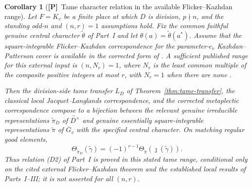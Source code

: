 \documentclass[11pt]{article}
\newcommand{\Gb}{\overline{G}}\newcommand{\GDb}{\overline{G}_D}\newcommand{\Zb}{\overline{Z}}
\newcommand{\Ptag}{\textnormal{\textbf{[P]}}}
\theoremstyle{plain}
\newtheorem{corollary}[theorem]{Corollary}
\theoremstyle{definition}
\begin{document}
\begin{corollary}[\Ptag\ Tame character relation in the available Flicker--Kazhdan range]\label{cor:D2tame}
Let $F=K_v$ be a finite place at which $D$ is division,
$p\nmid n$, and the standing odd-$n$ and $(n,r)=1$ assumptions
hold. Fix the common faithful genuine central character
$\widetilde\theta$ of Part~I and let
$\theta(a)=\widetilde\theta(a^*)$.
Assume that the square-integrable Flicker--Kazhdan correspondence
for the parameter-$c_v$ Kazhdan--Patterson cover is available
in the corrected form of \cite[Proposition~3.6 and
Definition~3.7]{Zou}. A sufficient published range for this
external input is $(n,N_r)=1$, where $N_r$ is the least common
multiple of the composite positive integers at most $r$, with
$N_r=1$ when there are none \cite[\S26]{FK86}.

Then the division-side tame transfer $L_D$ of
Theorem~\ref{thm:tame-transfer}, the classical local
Jacquet--Langlands correspondence, and the corrected metaplectic
correspondence compose to a bijection between the relevant
genuine irreducible representations $\widetilde\pi_D$ of
$\widetilde{D^\times}$ and genuine essentially square-integrable
representations $\widetilde\pi$ of $\Gb_v$ with the specified
central character.  On matching regular good elements,
\begin{equation}\label{eq:tame-D2}
 \boxed{\quad
 \Theta_{\widetilde\pi_D}(\widetilde\gamma)
 =(-1)^{r-1}\Theta_{\widetilde\pi}
       (\jmath(\widetilde\gamma)).\quad}
\end{equation}
Thus relation (D2) of Part~I is proved in this stated tame
range, conditional \emph{only} on the cited external
Flicker--Kazhdan theorem and the established local results of
Parts~I--III; it is not asserted for all $(n,r)$.
\end{corollary}
\end{document}
